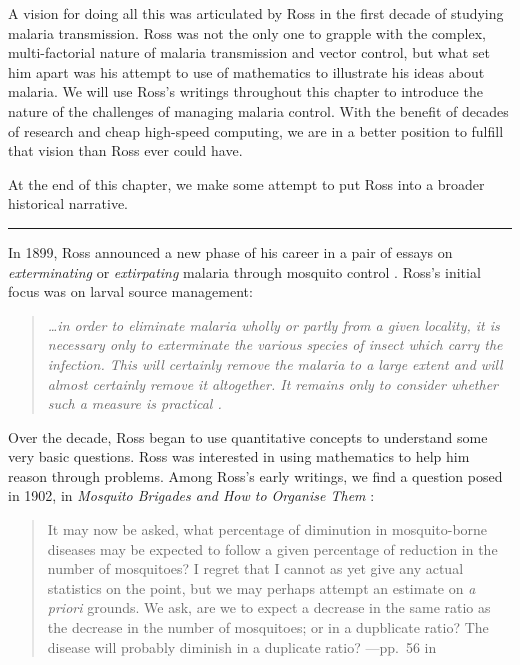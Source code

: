 \documentclass[
]{book}
\begin{document}
A vision for doing all this was articulated by Ross in the first decade of studying malaria transmission.
Ross was not the only one to grapple with the complex, multi-factorial nature of malaria transmission and vector control, but what set him apart was his attempt to use of mathematics to illustrate his ideas about malaria.
We will use Ross's writings throughout this chapter to introduce the nature of the challenges of managing malaria control.
With the benefit of decades of research and cheap high-speed computing, we are in a better position to fulfill that vision than Ross ever could have.

At the end of this chapter, we make some attempt to put Ross into a broader historical narrative.

\begin{center}\rule{0.5\linewidth}{0.5pt}\end{center}

In 1899, Ross announced a new phase of his career in a pair of essays on \emph{exterminating} or \emph{extirpating} malaria through mosquito control \autocite{RossR1899ExterminationMalaria,RossR1899InauguralLecture}. Ross's initial focus was on larval source management:

\begin{quote}
\emph{\ldots in order to eliminate malaria wholly or partly from a given locality, it is necessary only to exterminate the various species of insect which carry the infection. This will certainly remove the malaria to a large extent and will almost certainly remove it altogether. It remains only to consider whether such a measure is practical \autocite{RossR1899ExterminationMalaria}.}
\end{quote}

Over the decade, Ross began to use quantitative concepts to understand some very basic questions. Ross was interested in using mathematics to help him reason through problems.
Among Ross's early writings, we find a question posed in 1902, in \emph{Mosquito Brigades and How to Organise Them} \autocite{RossR1902MosquitoBrigades}:

\begin{quote}
It may now be asked, what percentage of diminution in mosquito-borne diseases may be expected to follow a given percentage of reduction in the number of mosquitoes? I regret that I cannot as yet give any actual statistics on the point, but we may perhaps attempt an estimate on \emph{a priori} grounds. We ask, are we to expect a decrease in the same ratio as the decrease in the number of mosquitoes; or in a dupblicate ratio? The disease will probably diminish in a duplicate ratio? ---pp.~56 in \autocite{RossR1902MosquitoBrigades}
\end{quote}
\end{document}
